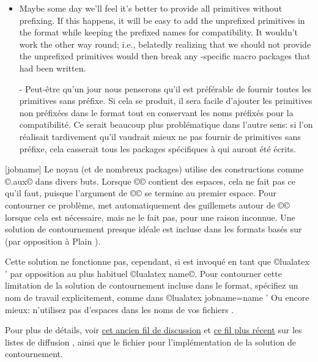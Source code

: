 \documentclass{lltxdoc}
\begin{document}
\begin{myquote}
\begin{enumerate}
\begin{itemize}
        \item Maybe some day we'll feel it's better to provide all primitives
          without prefixing. If this happens, it will be easy to add the
          unprefixed primitives in the format while keeping the prefixed names
          for compatibility. It wouldn't work the other way round; i.e.,
          belatedly realizing that we should not provide the unprefixed
          primitives would then break any \luatex-specific macro packages
          that had been written.

- Peut-être qu'un jour nous penserons qu'il est préférable de fournir toutes les primitives sans préfixe. Si cela se produit, il sera facile d'ajouter les primitives non préfixées dans le format tout en conservant les noms préfixés pour la compatibilité. Ce serait beaucoup plus problématique dans l'autre sens: si l'on réalisait tardivement qu'il vaudrait mieux ne pas fournir de primitives sans préfixe, cela casserait tous les packages spécifiques à \luatex qui auront été écrits.

      \end{itemize}
  \end{enumerate}
\end{myquote}

[jobname]
Le noyau \latex (et de nombreux packages) utilise des constructions comme
©\jobname.aux© dans divers buts. Lorsque ©\jobname© contient des espaces,
cela ne fait pas ce qu'il faut, puisque l'argument de ©© se termine au
premier espace. Pour contourner ce problème, \pdftex met automatiquement des
guillemets autour de ©\jobname© lorsque cela est nécessaire, mais \luatex ne le fait pas,
pour une raison inconnue. Une solution de contournement presque idéale
est incluse dans les formats \luatex basés sur \latex (par opposition à Plain \tex).

Cette solution ne fonctionne pas, cependant, si \luatex est invoqué en tant
que ©lualatex ' par opposition au plus habituel ©lualatex name©.
Pour contourner cette limitation de la solution de contournement incluse dans le format,
spécifiez un nom de travail explicitement, comme dans
©lualatex jobname=name ' Ou encore mieux: n'utilisez pas d'espaces
dans les noms de vos fichiers \tex.

Pour plus de détails, voir \href{http://www.ntg.nl/pipermail/dev-luatex/2009-April/002549.html}{cet
ancien fil de discussion} et \href{http://tug.org/pipermail/luatex/2010-August/001986.html}{ce fil
plus récent} sur les listes de diffusion \luatex, ainsi que le fichier 
pour l'implémentation de la solution de contournement.
\end{document}
